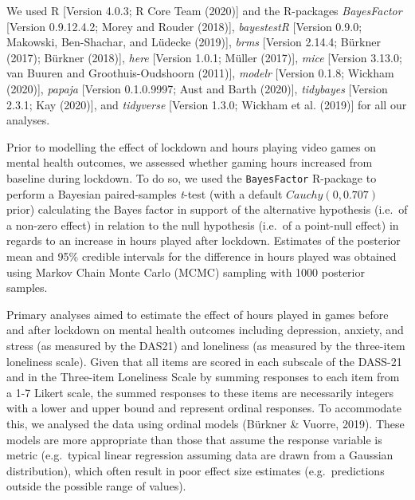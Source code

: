 \documentclass[
  english,
  man,floatsintext]{apa6}
\begin{document}
We used R {[}Version 4.0.3; R Core Team (2020){]} and the R-packages \emph{BayesFactor} {[}Version 0.9.12.4.2; Morey and Rouder (2018){]}, \emph{bayestestR} {[}Version 0.9.0; Makowski, Ben-Shachar, and Lüdecke (2019){]}, \emph{brms} {[}Version 2.14.4; Bürkner (2017); Bürkner (2018){]}, \emph{here} {[}Version 1.0.1; Müller (2017){]}, \emph{mice} {[}Version 3.13.0; van Buuren and Groothuis-Oudshoorn (2011){]}, \emph{modelr} {[}Version 0.1.8; Wickham (2020){]}, \emph{papaja} {[}Version 0.1.0.9997; Aust and Barth (2020){]}, \emph{tidybayes} {[}Version 2.3.1; Kay (2020){]}, and \emph{tidyverse} {[}Version 1.3.0; Wickham et al. (2019){]} for all our analyses.

Prior to modelling the effect of lockdown and hours playing video games on mental health outcomes, we assessed whether gaming hours increased from baseline during lockdown. To do so, we used the \texttt{BayesFactor} R-package to perform a Bayesian paired-samples \emph{t}-test (with a default \(Cauchy(0, 0.707)\) prior) calculating the Bayes factor in support of the alternative hypothesis (i.e.~of a non-zero effect) in relation to the null hypothesis (i.e.~of a point-null effect) in regards to an increase in hours played after lockdown. Estimates of the posterior mean and 95\% credible intervals for the difference in hours played was obtained using Markov Chain Monte Carlo (MCMC) sampling with 1000 posterior samples.

Primary analyses aimed to estimate the effect of hours played in games before and after lockdown on mental health outcomes including depression, anxiety, and stress (as measured by the DAS21) and loneliness (as measured by the three-item loneliness scale). Given that all items are scored in each subscale of the DASS-21 and in the Three-item Loneliness Scale by summing responses to each item from a 1-7 Likert scale, the summed responses to these items are necessarily integers with a lower and upper bound and represent ordinal responses. To accommodate this, we analysed the data using ordinal models (Bürkner \& Vuorre, 2019). These models are more appropriate than those that assume the response variable is metric (e.g.~typical linear regression assuming data are drawn from a Gaussian distribution), which often result in poor effect size estimates (e.g.~predictions outside the possible range of values).
\end{document}
